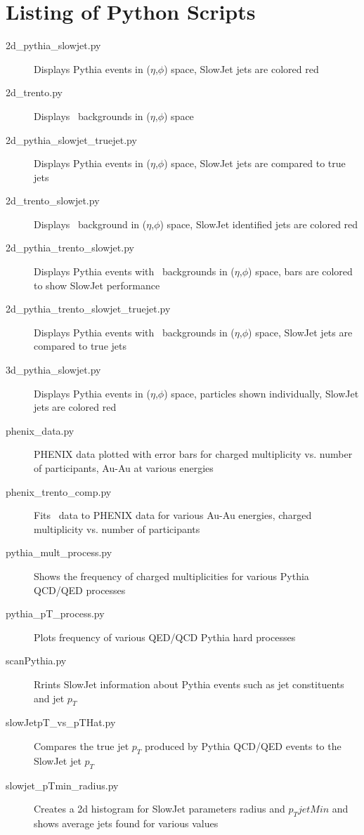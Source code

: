 \documentclass[11pt]{article}
\begin{document}
\appendix

\section{Listing of Python Scripts}
\begin{description}
\item[2d\_pythia\_slowjet.py] Displays Pythia events in ($\eta$,$\phi$) space, SlowJet jets are colored red
\item[2d\_trento.py] Displays \trento\ backgrounds in ($\eta$,$\phi$) space
\item[2d\_pythia\_slowjet\_truejet.py] Displays Pythia events in ($\eta$,$\phi$) space, SlowJet jets are compared to true jets
\item[2d\_trento\_slowjet.py] Displays \trento\ background in ($\eta$,$\phi$) space, SlowJet identified jets are colored red
\item[2d\_pythia\_trento\_slowjet.py] Displays Pythia events with \trento\ backgrounds in ($\eta$,$\phi$) space, bars are colored to show SlowJet performance
\item[2d\_pythia\_trento\_slowjet\_truejet.py] Displays Pythia events with \trento\ backgrounds in ($\eta$,$\phi$) space, SlowJet jets are compared to true jets
\item[3d\_pythia\_slowjet.py] Displays Pythia events in ($\eta$,$\phi$) space, particles shown individually, SlowJet jets are colored red
%
\item[phenix\_data.py] PHENIX data plotted with error bars for charged multiplicity vs. number of participants, Au-Au at various energies
\item[phenix\_trento\_comp.py] Fits \trento\ data to PHENIX data for various Au-Au energies, charged multiplicity vs. number of participants
%
\item[pythia\_mult\_process.py] Shows the frequency of charged multiplicities for various Pythia QCD/QED processes
\item[pythia\_pT\_process.py] Plots frequency of various QED/QCD Pythia hard processes
%
\item[scanPythia.py] Rrints SlowJet information about Pythia events such as jet constituents and jet $p_T$
\item[slowJetpT\_vs\_pTHat.py] Compares the true jet $p_T$ produced by Pythia QCD/QED events to the SlowJet jet $p_T$ 
\item[slowjet\_pTmin\_radius.py] Creates a 2d histogram for SlowJet parameters radius and $p_TjetMin$ and shows average jets found for various values

\end{description}
\end{document}
